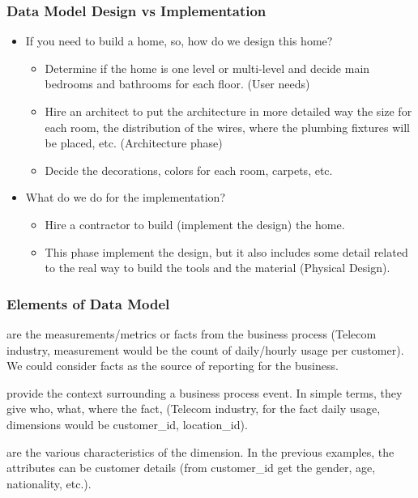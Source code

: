\begin{frame}
    \frametitle{Data Model Design vs Implementation}
    \begin{itemize}[<+->]
        \item If you need to build a home, so, how do we design this home?
        \begin{itemize}[<+->]
            \item Determine if the home is one level or multi-level and decide main bedrooms and bathrooms for each floor. (User needs)
            \item Hire an architect to put the architecture in more detailed way \forexample the size for each room, the distribution of the wires, where the plumbing fixtures will be placed, etc. (Architecture phase)
            \item Decide the decorations, colors for each room, carpets, etc.
        \end{itemize}
        \item What do we do for the implementation?
        \begin{itemize}[<+->]
            \item Hire a contractor to build (implement the design) the home.
            \item This phase implement the design, but it also includes some detail related to the real way to build the tools and the material (Physical Design).
        \end{itemize}
    \end{itemize}
\end{frame}

\begin{frame}
    \frametitle{Elements of Data Model}
    \begin{description}[<+->]
        \item[Facts] are the measurements/metrics or facts from the business process \forexample (Telecom industry, measurement would be the count of daily/hourly usage per customer). We could consider facts as the source of reporting for the business.
        \item[Dimensions] provide the context surrounding a business process event. In simple terms, they give who, what, where the fact, \forexample (Telecom industry, for the fact daily usage, dimensions would be customer\_id, location\_id).
        
        \item[Attributes] are the various characteristics of the dimension. In the previous examples, the attributes can be customer details (from customer\_id get the gender, age, nationality, etc.).
    \end{description}
\end{frame}

